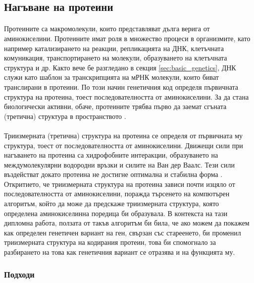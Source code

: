 \documentclass[pdftex,cyrillic,14pt,a4page,twoside,openright]{extreport}
\begin{document}
\subsection{Нагъване на протеини}
\paragraph{}
Протеините са макромолекули, които представляват дълга верига от аминокиселини. Протеините имат роля в множество процеси в организмите, като например катализирането на реакции, репликацията на ДНК, клетъчната комуникация, транспортирането на молекули, образуването на клетъчната структура и др. Както вече бе разгледано в секция \ref{sec:basic_genetics}, ДНК служи като шаблон за транскрипцията на мРНК молекули, които биват транслирани в протеини. По този начин генетичния код определя първичната структура на протеина, тоест последователността от аминокиселини. За да стана биологически активни, обаче, протеините трябва първо да заемат сгъната (третична) структура в пространството \cite{creighton1990protein}.

\paragraph{}
Триизмерната (третична) структура на протеина се определя от първичната му структура, тоест от последователността от аминокиселини. Движещи сили при нагъването на протеина са хидрофобните интеракции, образуването на междумолекулярни водородни връзки и силите на Ван дер Ваалс. Тези сили въздействат докато протеина не достигне оптимална и стабилна форма \cite{dill2008}. Откритието, че триизмерната структура на протеина зависи почти изцяло от последователността от аминокиселини, поражда търсенето на компютърен алгоритъм, който да може да предскаже триизмерната структура, която определена аминокиселинна поредица би образувала. В контекста на тази дипломна работа, ползата от такъв алгоритъм би била, че ако можем да покажем как определен генетичен вариант на ген, свързан със стареенето, би променил триизмерната структура на кодирания протеин, това би спомогнало за разбирането на това как генетичния вариант се отразява и на функцията му.

\subsubsection{Подходи}
\end{document}
